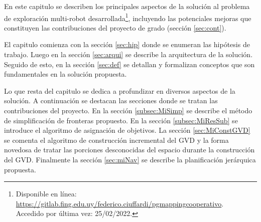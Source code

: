 En este capitulo se describen los principales aspectos de la solución al
problema de exploración multi-robot desarrollada\footnote{Disponible en
línea:\\
\url{https://gitlab.fing.edu.uy/federico.ciuffardi/pgmappingcooperativo}.\\ Accedido por última vez: 25/02/2022.},
incluyendo las potenciales mejoras que constituyen las contribuciones del
proyecto de grado (sección \ref{sec:cont}).

El capitulo comienza con la sección \ref{sec:hip} donde se enumeran las
hipótesis de trabajo. Luego en la sección \ref{sec:arqui} se describe la
arquitectura de la solución. Seguido de esto, en la sección \ref{sec:def} se
detallan y formalizan conceptos que son fundamentales en la solución propuesta.

Lo que resta del capitulo se dedica a profundizar en diversos aspectos de la
solución. A continuación se destacan las secciones donde se tratan las
contribuciones del proyecto. En la sección \ref{subsec:MiSimp} se describe el
método de simplificación de fronteras propuesto. En la sección
\ref{subsec:MiResSub} se introduce el algoritmo de asignación de objetivos. La sección
\ref{sec:MiConstGVD} se comenta el algoritmo de
construcción incremental del GVD y la forma novedosa de tratar
las porciones desconocidas del espacio durante la construcción del GVD.
Finalmente la sección \ref{sec:miNav} se describe la planificación jerárquica
propuesta.



